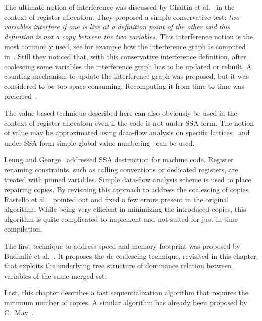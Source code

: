 The ultimate notion of interference was discussed by Chaitin et al.~\cite{Chaitin81} in the context of register allocation. 
They proposed a simple conservative test: 
\emph{two variables interfere if one is live at a definition point of the other and this definition is not a copy between the two variables}. 
This interference notion is the most commonly used, see for example how the interference graph is computed in~\cite{appel97modern}. 
Still they noticed that, with this conservative interference definition, after coalescing some variables the interference graph has to be updated or rebuilt. 
A counting mechanism to update the interference graph was proposed, but it was considered to be too space consuming. 
Recomputing it from time to time was preferred~\cite{Chaitin81,Chaitin82}.

The value-based technique described here can also obviously be used in the context of register allocation even if the code is not under SSA form. 
The notion of value may be approximated using data-flow analysis on specific lattices~\cite{AlpernWZ88} and under SSA form simple global value numbering~\cite{Rosen88} can be used.

Leung and George~\cite{Leung:1999:PLDI} addressed SSA destruction for machine code. 
Register renaming constraints, such as calling conventions or dedicated registers, are treated with pinned variables. 
Simple data-flow analysis scheme is used to place repairing copies. 
By revisiting this approach to address the coalescing of copies Rastello et al.~\cite{Rastello:2004:CGO} pointed out and fixed a few errors present in the original algorithm. 
While being very efficient in minimizing the introduced copies, this algorithm is quite complicated to implement and not suited for just in time compilation.

The first technique to address speed and memory footprint was proposed by Budimli\'{c} et al.~\cite{Budimlic02}. 
It proposes the de-coalescing technique, revisited in this chapter, that exploits the underlying tree structure of dominance relation between variables of the same merged-set.

Last, this chapter describes a fast sequentialization algorithm that requires the minimum number of copies. 
A similar algorithm has already been proposed by C.~May~\cite{May89}.





